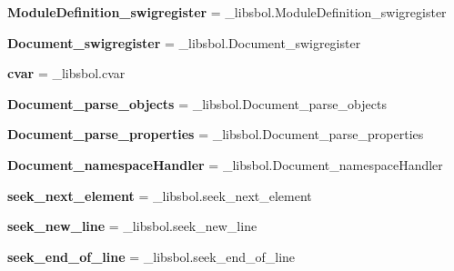 \begin{DoxyCompactItemize}
\item 
{\bfseries Module\+Definition\+\_\+swigregister} = \+\_\+libsbol.\+Module\+Definition\+\_\+swigregister\hypertarget{namespacesbol_1_1libsbol_ab302887cc7026857e99e959f2f89115d}{}\label{namespacesbol_1_1libsbol_ab302887cc7026857e99e959f2f89115d}

\item 
{\bfseries Document\+\_\+swigregister} = \+\_\+libsbol.\+Document\+\_\+swigregister\hypertarget{namespacesbol_1_1libsbol_aae65bd4c0fa8635c78d756795ad7def8}{}\label{namespacesbol_1_1libsbol_aae65bd4c0fa8635c78d756795ad7def8}

\item 
{\bfseries cvar} = \+\_\+libsbol.\+cvar\hypertarget{namespacesbol_1_1libsbol_a4234ca6e321704823e29725ca4706138}{}\label{namespacesbol_1_1libsbol_a4234ca6e321704823e29725ca4706138}

\item 
{\bfseries Document\+\_\+parse\+\_\+objects} = \+\_\+libsbol.\+Document\+\_\+parse\+\_\+objects\hypertarget{namespacesbol_1_1libsbol_a5dd27a41aeb733753f30846595267148}{}\label{namespacesbol_1_1libsbol_a5dd27a41aeb733753f30846595267148}

\item 
{\bfseries Document\+\_\+parse\+\_\+properties} = \+\_\+libsbol.\+Document\+\_\+parse\+\_\+properties\hypertarget{namespacesbol_1_1libsbol_a0e373d62bca7f95d7484f758a558c294}{}\label{namespacesbol_1_1libsbol_a0e373d62bca7f95d7484f758a558c294}

\item 
{\bfseries Document\+\_\+namespace\+Handler} = \+\_\+libsbol.\+Document\+\_\+namespace\+Handler\hypertarget{namespacesbol_1_1libsbol_acceaf15e59e0b9f021798f2b3cca48b6}{}\label{namespacesbol_1_1libsbol_acceaf15e59e0b9f021798f2b3cca48b6}

\item 
{\bfseries seek\+\_\+next\+\_\+element} = \+\_\+libsbol.\+seek\+\_\+next\+\_\+element\hypertarget{namespacesbol_1_1libsbol_a83b85610f60ce11d913f151cf3755659}{}\label{namespacesbol_1_1libsbol_a83b85610f60ce11d913f151cf3755659}

\item 
{\bfseries seek\+\_\+new\+\_\+line} = \+\_\+libsbol.\+seek\+\_\+new\+\_\+line\hypertarget{namespacesbol_1_1libsbol_a58faed15c0d627ba680e2bd6569bf214}{}\label{namespacesbol_1_1libsbol_a58faed15c0d627ba680e2bd6569bf214}

\item 
{\bfseries seek\+\_\+end\+\_\+of\+\_\+line} = \+\_\+libsbol.\+seek\+\_\+end\+\_\+of\+\_\+line\hypertarget{namespacesbol_1_1libsbol_a49c883bdc4f0746576ee3577c3a94e8e}{}\label{namespacesbol_1_1libsbol_a49c883bdc4f0746576ee3577c3a94e8e}


\end{DoxyCompactItemize}
